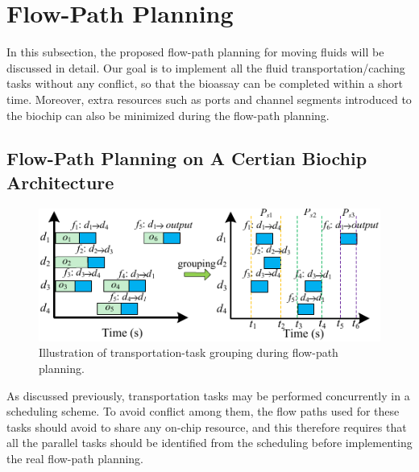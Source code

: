 \section{Flow-Path Planning}
\label{sec:flow_paths}

In this subsection, the proposed flow-path planning for moving fluids will be discussed in detail. Our goal is to implement all the fluid transportation/caching tasks without any conflict, so that the bioassay can be completed within a short time. Moreover, extra resources such as ports and channel segments introduced to the biochip can also be minimized during the flow-path planning.

\subsection{Flow-Path Planning on A Certian Biochip Architecture}
\label{sec:constructing_paths_given}

\begin{figure}[t]
    \centering
    \includegraphics[width=1.0\linewidth]{Visio/task_division.pdf}
  \caption{Illustration of transportation-task grouping during flow-path planning.}
      \label{fig:concurrent_set}
\end{figure}

As discussed previously, transportation tasks may be performed concurrently in a scheduling scheme. To avoid conflict among them, the flow paths used for these tasks should avoid to share any on-chip resource, and this therefore requires that all the parallel tasks should be identified from the scheduling before implementing the real flow-path planning.

